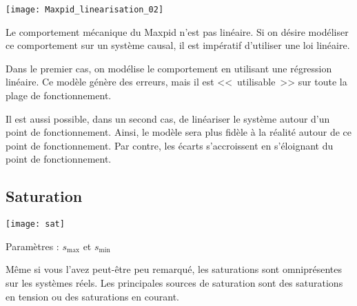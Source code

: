 \begin{marginfigure}[2cm]
\texttt{[image: Maxpid\_linearisation\_02]}
\end{marginfigure}

\begin{exemple}
Le comportement mécanique du Maxpid n'est pas linéaire. Si on désire modéliser ce comportement sur un système causal, il est impératif d'utiliser une loi linéaire. 

Dans le premier cas, on modélise le comportement en utilisant une régression linéaire. 
Ce modèle génère des erreurs, mais il est <<~utilisable~>> sur toute la plage de fonctionnement. 

Il est aussi possible, dans un second cas, de linéariser le système autour d'un point de fonctionnement. Ainsi, le modèle sera plus fidèle à la réalité autour de ce point de fonctionnement. Par contre, les écarts s'accroissent en s'éloignant du point de fonctionnement. 

\end{exemple}

\subsection{Saturation}

\begin{marginfigure}
\centering
\texttt{[image: sat]}

Paramètres : $s_{\text{max}}$ et $s_{\text{min}}$
\end{marginfigure}

\begin{marginfigure}
\centering
{}
\end{marginfigure}

Même si vous l'avez peut-être peu remarqué, les saturations sont omniprésentes sur les systèmes réels. Les principales sources de saturation sont des saturations en tension ou des saturations en courant. 

